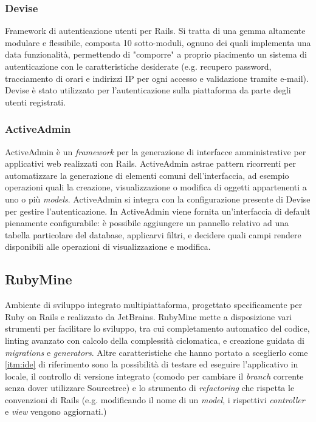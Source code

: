 \subsubsection{Devise}
Framework di autenticazione utenti per Rails. Si tratta di una gemma altamente modulare e flessibile, composta 10 sotto-moduli, ognuno dei quali implementa una data funzionalità, permettendo di "comporre" a proprio piacimento un sistema di autenticazione con le caratteristiche desiderate (e.g. recupero password, tracciamento di orari e indirizzi IP per ogni accesso e validazione tramite e-mail). Devise è stato utilizzato per l'autenticazione sulla piattaforma da parte degli utenti registrati.

\subsubsection{ActiveAdmin}
ActiveAdmin è un \textit{framework} per la generazione di interfacce amministrative per applicativi web realizzati con Rails. ActiveAdmin astrae pattern ricorrenti per automatizzare la generazione di elementi comuni dell'interfaccia, ad esempio operazioni quali la creazione, visualizzazione o modifica di oggetti appartenenti a uno o più \textit{models}. ActiveAdmin si integra con la configurazione presente di Devise per gestire l'autenticazione. In ActiveAdmin viene fornita un'interfaccia di default pienamente configurabile: è possibile aggiungere un pannello relativo ad una tabella particolare del database, applicarvi filtri, e decidere quali campi rendere disponibili alle operazioni di visualizzazione e modifica.

\subsection{RubyMine}
Ambiente di sviluppo integrato multipiattaforma, progettato specificamente per Ruby on Rails e realizzato da JetBrains. RubyMine mette a disposizione vari strumenti per facilitare lo sviluppo, tra cui completamento automatico del codice, linting avanzato con calcolo della complessità ciclomatica, e creazione guidata di \textit{migrations} e \textit{generators}. Altre caratteristiche che hanno portato a sceglierlo come \ref{itm:ide} di riferimento sono la possibilità di testare ed eseguire l'applicativo in locale, il controllo di versione integrato (comodo per cambiare il \textit{branch} corrente senza dover utilizzare Sourcetree) e lo strumento di \textit{refactoring} che rispetta le convenzioni di Rails (e.g. modificando il nome di un \textit{model}, i rispettivi \textit{controller} e \textit{view} vengono aggiornati.) 

